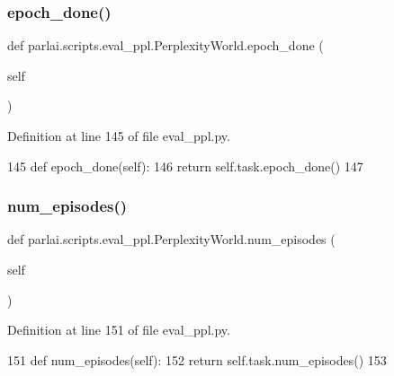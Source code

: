 \subsubsection{\texorpdfstring{epoch\+\_\+done()}{epoch\_done()}}
{\footnotesize\ttfamily def parlai.\+scripts.\+eval\+\_\+ppl.\+Perplexity\+World.\+epoch\+\_\+done (\begin{DoxyParamCaption}\item[{}]{self }\end{DoxyParamCaption})}



Definition at line 145 of file eval\+\_\+ppl.\+py.


\begin{DoxyCode}
145     \textcolor{keyword}{def }epoch\_done(self):
146         \textcolor{keywordflow}{return} self.task.epoch\_done()
147 
\end{DoxyCode}
\mbox{\label{classparlai_1_1scripts_1_1eval__ppl_1_1PerplexityWorld_aed2ab6313608418defd2b167c1893e96}} 
\subsubsection{\texorpdfstring{num\+\_\+episodes()}{num\_episodes()}}
{\footnotesize\ttfamily def parlai.\+scripts.\+eval\+\_\+ppl.\+Perplexity\+World.\+num\+\_\+episodes (\begin{DoxyParamCaption}\item[{}]{self }\end{DoxyParamCaption})}



Definition at line 151 of file eval\+\_\+ppl.\+py.


\begin{DoxyCode}
151     \textcolor{keyword}{def }num\_episodes(self):
152         \textcolor{keywordflow}{return} self.task.num\_episodes()
153 
\end{DoxyCode}
\mbox{\label{classparlai_1_1scripts_1_1eval__ppl_1_1PerplexityWorld_a13673a4d9cb9a57fbc219336bea1f510}} 
